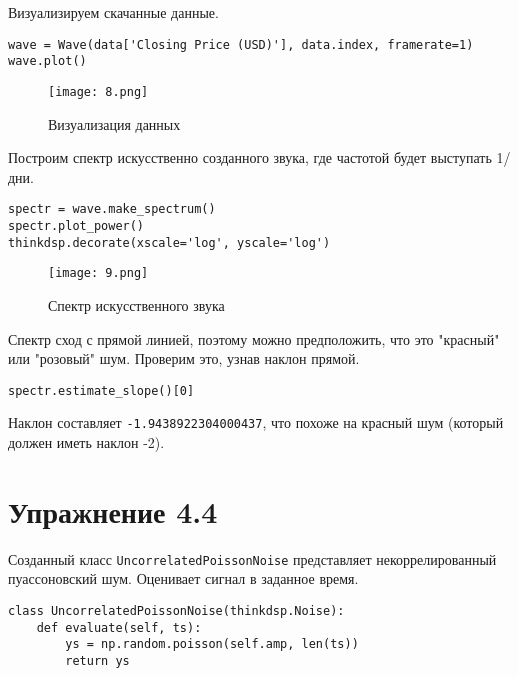 \documentclass[a4paper,12pt]{report}
\begin{document}
Визуализируем скачанные данные.

\begin{lstlisting}[caption=Визуализация данных]
wave = Wave(data['Closing Price (USD)'], data.index, framerate=1)
wave.plot()
\end{lstlisting}

\begin{figure}[H]
        \centering
        \texttt{[image: 8.png]}
        \caption{Визуализация данных}
        \label{fig:lab4_fig3_2}
\end{figure}

Построим спектр искусственно созданного звука, где частотой будет выступать 1/дни.

\begin{lstlisting}[caption=Спектр искусственного звука]
spectr = wave.make_spectrum()
spectr.plot_power()
thinkdsp.decorate(xscale='log', yscale='log')
\end{lstlisting}

\begin{figure}[H]
        \centering
        \texttt{[image: 9.png]}
        \caption{Спектр искусственного звука}
        \label{fig:lab4_fig3_3}
\end{figure}

Спектр сход с прямой линией, поэтому можно предположить, что это "красный" или "розовый" шум. Проверим это, узнав наклон прямой.

\begin{lstlisting}[caption=Наклон прямой]
spectr.estimate_slope()[0]
\end{lstlisting}

Наклон составляет \texttt{-1.9438922304000437}, что похоже на красный шум (который должен иметь наклон -2).

\chapter{Упражнение 4.4}

Созданный класс \texttt{UncorrelatedPoissonNoise} представляет некоррелированный пуассоновский шум. Оценивает сигнал в заданное время.

\begin{lstlisting}[caption=Созданный класс UncorrelatedPoissonNoise]
class UncorrelatedPoissonNoise(thinkdsp.Noise):
    def evaluate(self, ts):
        ys = np.random.poisson(self.amp, len(ts))
        return ys
\end{lstlisting}
\end{document}

